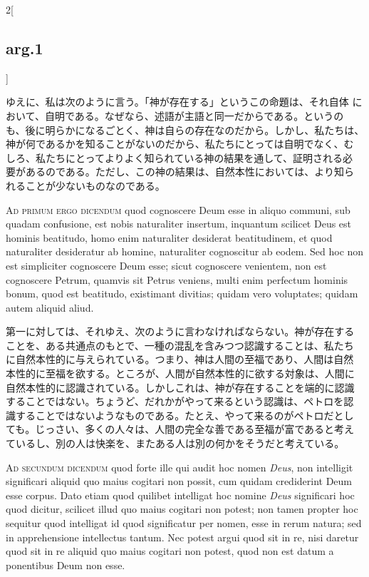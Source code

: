 \documentclass[paper=a4paper,fontsize=10pt,jafontsize=9pt,titlepage]{jlreq}
\begin{document}
\begin{paracol}{2}[\subsection{arg.1}]
\switchcolumn

ゆえに、私は次のように言う。「神が存在する」というこの命題は、それ自体
において、自明である。なぜなら、述語が主語と同一だからである。というの
も、後に明らかになるごとく、神は自らの存在なのだから。しかし、私たちは、
神が何であるかを知ることがないのだから、私たちにとっては自明でなく、む
しろ、私たちにとってよりよく知られている神の結果を通して、証明される必
要があるのである。ただし、この神の結果は、自然本性においては、より知ら
れることが少ないものなのである。

\switchcolumn*[\subsection{ad.1}]

{\scshape Ad primum ergo dicendum} quod cognoscere Deum esse in aliquo
communi, sub quadam confusione, est nobis naturaliter insertum,
inquantum scilicet Deus est hominis beatitudo, homo enim naturaliter
desiderat beatitudinem, et quod naturaliter desideratur ab homine,
naturaliter cognoscitur ab eodem. Sed hoc non est simpliciter
cognoscere Deum esse; sicut cognoscere venientem, non est cognoscere
Petrum, quamvis sit Petrus veniens, multi enim perfectum hominis
bonum, quod est beatitudo, existimant divitias; quidam vero
voluptates; quidam autem aliquid aliud.

\switchcolumn

第一に対しては、それゆえ、次のように言わなければならない。神が存在する
ことを、ある共通点のもとで、一種の混乱を含みつつ認識することは、私たち
に自然本性的に与えられている。つまり、神は人間の至福であり、人間は自然
本性的に至福を欲する。ところが、人間が自然本性的に欲する対象は、人間に
自然本性的に認識されている。しかしこれは、神が存在することを端的に認識
することではない。ちょうど、だれかがやって来るという認識は、ペトロを認
識することではないようなものである。たとえ、やって来るのがペトロだとし
ても。じっさい、多くの人々は、人間の完全な善である至福が富であると考え
ているし、別の人は快楽を、またある人は別の何かをそうだと考えている。

\switchcolumn*[\subsection{ad.2}]

{\scshape Ad secundum dicendum} quod forte ille qui audit hoc nomen {\itshape
Deus}, non intelligit significari aliquid quo maius cogitari non
possit, cum quidam crediderint Deum esse corpus. Dato etiam quod
quilibet intelligat hoc nomine {\itshape Deus} significari hoc quod
dicitur, scilicet illud quo maius cogitari non potest; non tamen
propter hoc sequitur quod intelligat id quod significatur per nomen,
esse in rerum natura; sed in apprehensione intellectus tantum. Nec
potest argui quod sit in re, nisi daretur quod sit in re aliquid quo
maius cogitari non potest, quod non est datum a ponentibus Deum non
esse.


\end{paracol}
\end{document}
